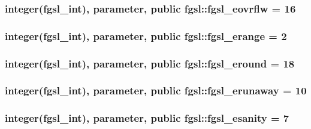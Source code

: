 \hypertarget{classfgsl_a7dc79e0a3af443223d2320c5e2b7b803}{
\subsubsection[{fgsl\-\_\-eovrflw}]{\setlength{\rightskip}{0pt plus 5cm}integer({\bf fgsl\-\_\-int}), parameter, public fgsl\-::fgsl\-\_\-eovrflw = 16}}\label{classfgsl_a7dc79e0a3af443223d2320c5e2b7b803}
\hypertarget{classfgsl_a25790738744df3ed3e0b2d50d9b30976}{
\subsubsection[{fgsl\-\_\-erange}]{\setlength{\rightskip}{0pt plus 5cm}integer({\bf fgsl\-\_\-int}), parameter, public fgsl\-::fgsl\-\_\-erange = 2}}\label{classfgsl_a25790738744df3ed3e0b2d50d9b30976}
\hypertarget{classfgsl_a46f7428fe03a54ce95e47c21d299a129}{
\subsubsection[{fgsl\-\_\-eround}]{\setlength{\rightskip}{0pt plus 5cm}integer({\bf fgsl\-\_\-int}), parameter, public fgsl\-::fgsl\-\_\-eround = 18}}\label{classfgsl_a46f7428fe03a54ce95e47c21d299a129}
\hypertarget{classfgsl_a89dc8311615f753f8b0b83a60e5f16c0}{
\subsubsection[{fgsl\-\_\-erunaway}]{\setlength{\rightskip}{0pt plus 5cm}integer({\bf fgsl\-\_\-int}), parameter, public fgsl\-::fgsl\-\_\-erunaway = 10}}\label{classfgsl_a89dc8311615f753f8b0b83a60e5f16c0}
\hypertarget{classfgsl_a9dc60d8f0ce30b7b328d703d09a0e987}{
\subsubsection[{fgsl\-\_\-esanity}]{\setlength{\rightskip}{0pt plus 5cm}integer({\bf fgsl\-\_\-int}), parameter, public fgsl\-::fgsl\-\_\-esanity = 7}}\label{classfgsl_a9dc60d8f0ce30b7b328d703d09a0e987}
